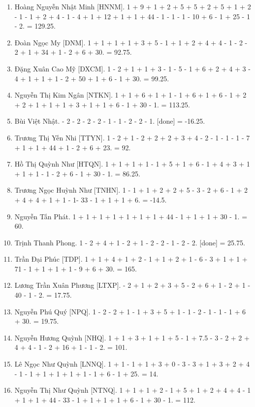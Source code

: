 \documentclass{article}
\begin{document}
\begin{enumerate}
	\item {\sc Hoàng Nguyễn Nhật Minh [HNNM].} 1 + 9 + 1 + 2 + 5 + 5 + 2 + 5 + 1 + 2 - 1 - 1 + 2 + 4 - 1 - 4 + 1 + 12 + 1 + 1 + 44 - 1 - 1 - 1 - 10 + 6 - 1 + 25 - 1 - 2. = 129.25.
	\item {\sc Đoàn Ngọc My [DNM].} 1 + 1 + 1 + 1 + 3 + 5 - 1 + 1 + 2 + 4 + 4 - 1 - 2 - 2 + 1 + 34 + 1 - 2 + 6 + 30. = 92.75.
	\item {\sc Đặng Xuân Cao Mỹ [DXCM].} 1 - 2 + 1 + 1 + 3 - 1 - 5 - 1 + 6 + 2 + 4 + 3 - 4 + 1 + 1 + 1 - 2 + 50 + 1 + 6 - 1 + 30. = 99.25.
	\item {\sc Nguyễn Thị Kim Ngân [NTKN].} 1 + 1 + 6 + 1 + 1 - 1 + 6 + 1 + 6 - 1 + 2 + 2 + 1 + 1 + 1 + 3 + 1 + 1 + 6 - 1 + 30 - 1. = 113.25.
	\item {\sc Bùi Việt Nhật.} - 2 - 2 - 2 - 2 - 1 - 1 - 2 - 2 - 1. [done] = -16.25.
	\item {\sc Trương Thị Yến Nhi [TTYN].} 1 - 2 + 1 - 2 + 2 + 2 + 3 + 4 - 2 - 1 - 1 - 1 - 7 + 1 + 1 + 44 + 1 - 2 + 6 + 23. = 92.
	\item {\sc Hồ Thị Quỳnh Như [HTQN].} 1 + 1 + 1 + 1 - 1 + 5 + 1 + 6 - 1 + 4 + 3 + 1 + 1 + 1 - 1 - 2 + 6 - 1 + 30 - 1. = 86.25.
	\item {\sc Trương Ngọc Huỳnh Như [TNHN].} 1 - 1 + 1 + 2 + 2 + 5 - 3 - 2 + 6 - 1 + 2 + 4 + 4 + 1 + 1 - 1- 33 - 1 + 1 + 1 + 6. = -14.5.
	\item {\sc Nguyễn Tấn Phát.} 1 + 1 + 1 + 1 + 1 + 1 + 1 + 44 - 1 + 1 + 1 + 30 - 1. = 60.
	\item {\sc Trịnh Thanh Phong.} 1 - 2 + 4 + 1 - 2 + 1 - 2 - 2 - 1 - 2 - 2. [done] = 25.75.
	\item {\sc Trần Đại Phúc [TDP].} 1 + 1 + 4 + 1 + 2 - 1 + 1 + 2 + 1 - 6 - 3 + 1 + 1 + 71 - 1 + 1 + 1 + 1 - 9 + 6 + 30. = 165.
	\item {\sc Lương Trần Xuân Phương [LTXP].} - 2 + 1 + 2 + 3 + 5 - 2 + 6 + 1 - 2 + 1 - 40 - 1 - 2. = 17.75.
	\item {\sc Nguyễn Phú Quý [NPQ].} 1 - 2 - 2 + 1 - 1 + 3 + 5 + 1 - 1 - 2 - 1 - 1 - 1 + 6 + 30. = 19.75.
	\item {\sc Nguyễn Hương Quỳnh [NHQ].} 1 + 1 + 3 + 1 + 1 + 5 - 1 + 7.5 - 3 - 2 + 2 + 4 + 4 - 1 - 2 + 16 + 1 - 1 - 2. = 101.
	\item {\sc Lê Ngọc Như Quỳnh [LNNQ].} 1 + 1 - 1 + 1 + 3 + 0 - 3 - 3 + 1 + 3 + 2 + 4 - 1 - 1 + 1 + 1 + 1 + 1 - 1 + 6 - 1 + 25. = 14.
	\item {\sc Nguyễn Thị Như Quỳnh [NTNQ].} 1 + 1 + 1 + 2 - 1 + 5 + 1 + 2 + 4 + 4 - 1 + 1 + 1 + 44 - 33 - 1 + 1 + 1 + 1 + 6 - 1 + 30 - 1. = 112.

\end{enumerate}
\end{document}

